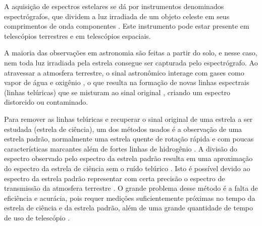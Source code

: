 \documentclass[11pt,twoside,a4paper]{article}
\begin{document}
\par A aquisição de espectros estelares se dá por instrumentos denominados espectrógrafos, que dividem a luz irradiada de um objeto celeste em seus comprimentos de onda componentes \cite{spectrograph_aus}. Este instrumento pode estar presente em telescópios terrestres e em telescópios espaciais.

\par A maioria das observações em astronomia são feitas a partir do solo, e nesse caso, nem toda luz irradiada pela estrela consegue ser capturada pelo espectrógrafo. Ao atravessar a atmosfera terrestre, o sinal astronômico interage com gases como vapor de água e oxigênio \cite{seifahrt2010precise}, o que resulta na formação de novas linhas espectrais (linhas telúricas) que se misturam ao sinal original \cite{catanzaro1997high}, criando um espectro distorcido ou contaminado.

\par Para remover as linhas telúricas e recuperar o sinal original de uma estrela a ser estudada (estrela de ciência), um dos métodos usados é a observação de uma estrela padrão, normalmente uma estrela quente de rotação rápida e com poucas características marcantes além de fortes linhas de hidrogênio \cite{seifahrt2010precise}. A divisão do espectro observado pelo espectro da estrela padrão resulta em uma aproximação do espectro da estrela de ciência sem o ruído telúrico \cite{rudolf2016modelling}. Isto é possível devido ao espectro da estrela padrão representar com certa precisão o espectro de transmissão da atmosfera terrestre \cite{ulmer2019telluric}. O grande problema desse método é a falta de eficiência e acurácia, pois requer medições suficientemente próximas no tempo da estrela de ciência e da estrela padrão, além de uma grande quantidade de tempo de uso de telescópio \cite{seifahrt2010precise}. 
\end{document}
